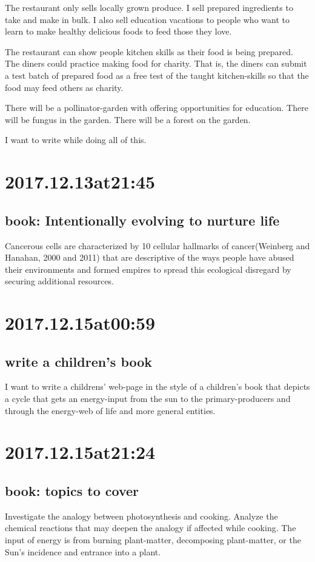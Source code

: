 \begin{enumerate}
\begin{enumerate}
The restaurant only sells locally grown produce. I sell prepared ingredients to take and make in bulk. I also sell education vacations to people who want to learn to make healthy delicious foods to feed those they love.

The restaurant can show people kitchen skills as their food is being prepared. The diners could practice making food for charity. That is, the diners can submit a test batch of prepared food as a free test of the taught kitchen-skills so that the food may feed others as charity.

There will be a pollinator-garden with offering opportunities for education. There will be fungus in the garden. There will be a forest on the garden.

I want to write while doing all of this.

\section*{ 2017.12.13at21:45 }
\subsection*{ book: Intentionally evolving to nurture life }
Cancerous cells are characterized by 10 cellular hallmarks of cancer(Weinberg and Hanahan, 2000 and 2011) that are descriptive of the ways people have abused their environments and formed empires to spread this ecological disregard by securing additional resources.

\section*{ 2017.12.15at00:59 }
\subsection*{ write a children's book }
I want to write a childrens' web-page in the style of a children's book that depicts a cycle that gets an energy-input from the sun to the primary-producers and through the energy-web of life and more general entities.


\section*{ 2017.12.15at21:24 }
\subsection*{ book: topics to cover }
Investigate the analogy between photosynthesis and cooking. Analyze the chemical reactions that may deepen the analogy if affected while cooking. The input of energy is from burning plant-matter, decomposing plant-matter, or the Sun's incidence and entrance into a plant.


\end{enumerate}
\end{enumerate}
